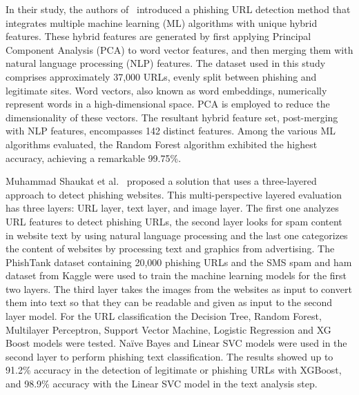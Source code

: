 In their study, the authors of~\cite{Kumar2023222} introduced a phishing URL detection method that integrates multiple machine learning (ML) algorithms with unique hybrid features. These hybrid features are generated by first applying Principal Component Analysis (PCA) to word vector features, and then merging them with natural language processing (NLP) features. The dataset used in this study comprises approximately 37,000 URLs, evenly split between phishing and legitimate sites. Word vectors, also known as word embeddings, numerically represent words in a high-dimensional space. PCA is employed to reduce the dimensionality of these vectors. The resultant hybrid feature set, post-merging with NLP features, encompasses 142 distinct features. Among the various ML algorithms evaluated, the Random Forest algorithm exhibited the highest accuracy, achieving a remarkable 99.75\%.

Muhammad Shaukat et al.~\cite{Shaukat2023} proposed a solution that uses a three-layered approach to detect phishing websites. This multi-perspective layered evaluation has three layers: URL layer, text layer, and image layer. The first one analyzes URL features to detect phishing URLs, the second layer looks for spam content in website text by using natural language processing and the last one categorizes the content of websites by processing text and graphics from advertising. The PhishTank dataset containing 20,000 phishing URLs and the SMS spam and ham dataset from Kaggle were used to train the machine learning models for the first two layers. The third layer takes the images from the websites as input to convert them into text so that they can be readable and given as input to the second layer model. For the URL classification the Decision Tree, Random Forest, Multilayer Perceptron, Support Vector Machine, Logistic Regression and XG Boost models were tested. Naïve Bayes and Linear SVC models were used in the second layer to perform phishing text classification. The results showed up to 91.2\% accuracy in the detection of legitimate or phishing URLs with XGBoost, and 98.9\% accuracy with the Linear SVC model in the text analysis step.

